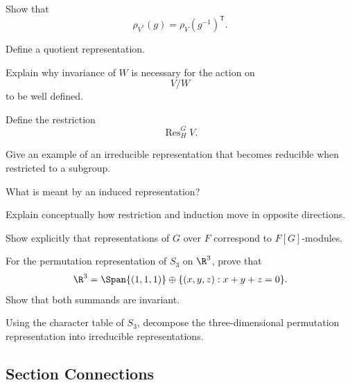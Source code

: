 \begin{exercise}[2]
Show that
\[ \rho_{V^*}(g)=\rho_V(g^{-1})^{\mathsf T}. \]
\end{exercise}

\begin{exercise}[1]
Define a quotient representation.
\end{exercise}

\begin{exercise}[2]
Explain why invariance of \(W\) is necessary for the action on
\[ V/W \]
to be well defined.
\end{exercise}

\begin{exercise}[1]
Define the restriction
\[ \operatorname{Res}_H^G V. \]
\end{exercise}

\begin{exercise}[2]
Give an example of an irreducible representation that becomes reducible when
restricted to a subgroup.
\end{exercise}

\begin{exercise}[1]
What is meant by an induced representation?
\end{exercise}

\begin{exercise}[2]
Explain conceptually how restriction and induction move in opposite
directions.
\end{exercise}

\begin{exercise}[2]
Show explicitly that representations of \(G\) over \(F\) correspond to
\(F[G]\)-modules.
\end{exercise}

\begin{exercise}[3]
For the permutation representation of \(S_3\) on \(\R^3\), prove that
\[ \R^3=\Span\{(1,1,1)\}\oplus
\{(x,y,z):x+y+z=0\}. \]
Show that both summands are invariant.
\end{exercise}

\begin{exercise}[3]
Using the character table of \(S_3\), decompose the three-dimensional
permutation representation into irreducible representations.
\end{exercise}

\subsection{Section Connections}
\label{subsec:representation-theory-connections}

